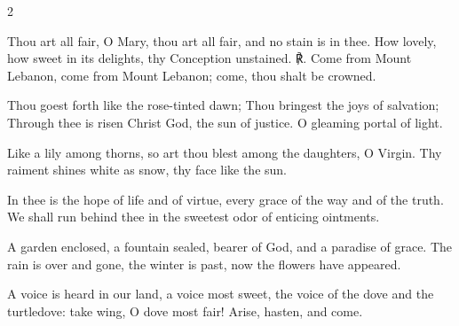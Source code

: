 \begin{multicols}{2}
\raggedcolumns
\begin{enpars}
Thou art all fair, O Mary, thou art all fair, and no stain is in thee. How lovely,
how sweet in its delights, thy Conception unstained. ℟. Come from Mount
Lebanon, come from Mount Lebanon; come, thou shalt be crowned.

Thou goest forth like the rose-tinted dawn; Thou bringest the joys of salvation;
Through thee is risen Christ God, the sun of justice. O gleaming portal of light.

Like a lily among thorns, so art thou blest among the daughters, O Virgin. Thy
raiment shines white as snow, thy face like the sun.

In thee is the hope of life and of virtue, every grace of the way and of the truth.
We shall run behind thee in the sweetest odor of enticing ointments.

A garden enclosed, a fountain sealed, bearer of God, and a paradise of grace.
The rain is over and gone, the winter is past, now the flowers have appeared.

A voice is heard in our land, a voice most sweet, the voice of the dove and the
turtledove: take wing, O dove most fair! Arise, hasten, and come.
\end{enpars}
\end{multicols}